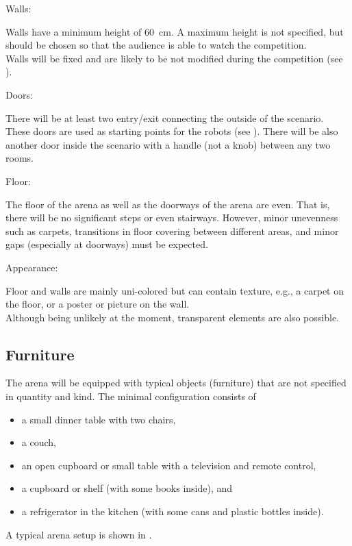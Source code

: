 \begin{enumerate}
	{\bf\item Walls:} Walls have a minimum height of \SI{60}{\centi\meter}. A maximum height is not specified, but should be chosen so that the audience is able to watch the competition.\\
	Walls will be fixed and are likely to be not modified during the competition (see ). 

	{\bf\item Doors:} There will be at least two entry/exit  connecting the outside of the scenario. These doors are used as starting points for the robots (see ).
	There will be also another door inside the scenario with a handle (not a knob) between any two rooms.

	{\bf\item Floor:} The floor of the arena as well as the doorways of the arena are even. That is, there will be no significant steps or even stairways. However, minor unevenness such as carpets, transitions in floor covering between different areas, and minor gaps (especially at doorways) must be expected.

	{\bf\item Appearance:} Floor and walls are mainly uni-colored but can contain texture, e.g., a carpet on the floor, or a poster or picture on the wall.\\
	Although being unlikely at the moment, transparent elements are also possible. 
\end{enumerate}


\subsection{Furniture}
\label{rule:scenario_furniture}

The arena will be equipped with typical objects (furniture) that are not specified in quantity and kind. The minimal configuration consists of 
\begin{itemize}
	\item a small dinner table with two chairs, 
	\item a couch, 
	\item an open cupboard or small table with a television and remote control, 
	\item a cupboard or shelf (with some books inside), and
	\item a refrigerator in the kitchen (with some cans and plastic bottles inside). 
\end{itemize}
A typical arena setup is shown in .

